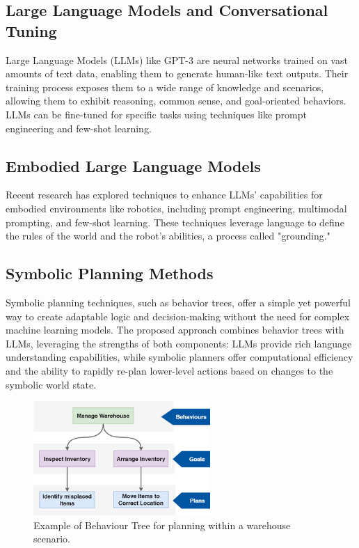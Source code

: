 \documentclass[pdflatex,sn-mathphys-num]{sn-jnl}%
\theoremstyle{thmstyleone}%
\theoremstyle{thmstyletwo}%
\theoremstyle{thmstylethree}%
\begin{document}
\subsection{Large Language Models and Conversational Tuning}
Large Language Models (LLMs) like GPT-3 are neural networks trained on vast amounts of text data, enabling them to generate human-like text outputs. Their training process exposes them to a wide range of knowledge and scenarios, allowing them to exhibit reasoning, common sense, and goal-oriented behaviors. LLMs can be fine-tuned for specific tasks using techniques like prompt engineering and few-shot learning.

\subsection{Embodied Large Language Models}
Recent research has explored techniques to enhance LLMs' capabilities for embodied environments like robotics, including prompt engineering, multimodal prompting, and few-shot learning. These techniques leverage language to define the rules of the world and the robot's abilities, a process called "grounding."

\subsection{Symbolic Planning Methods}
Symbolic planning techniques, such as behavior trees, offer a simple yet powerful way to create adaptable logic and decision-making without the need for complex machine learning models. The proposed approach combines behavior trees with LLMs, leveraging the strengths of both components: LLMs provide rich language understanding capabilities, while symbolic planners offer computational efficiency and the ability to rapidly re-plan lower-level actions based on changes to the symbolic world state.

\begin{figure}[h]
\centering
\includegraphics[width=0.6\textwidth]{figures/Picture11.png}
\caption{Example of Behaviour Tree for planning within a warehouse scenario.}\label{fig2}
\end{figure}
\end{document}
